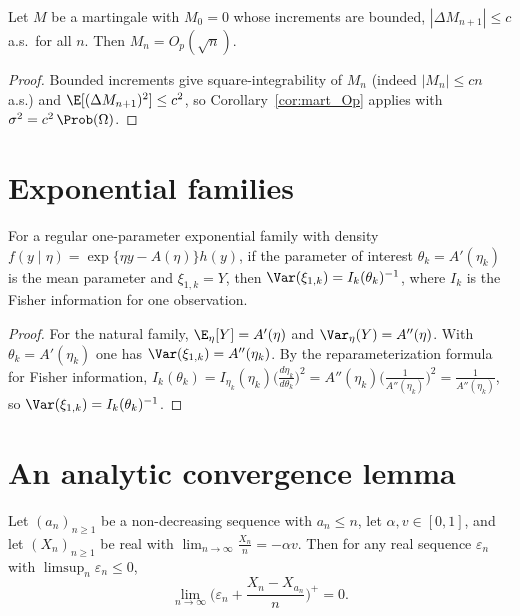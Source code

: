 \begin{lemma}\label{lem:mart_bdd_incr_Op}
\leanok
{}
Let $M$ be a martingale with $M_0 = 0$ whose increments are bounded,
$|\Delta M_{n+1}| \le c$ a.s.\ for all $n$. Then $M_n = O_p(\sqrt n)$.
\end{lemma}

\begin{proof}\leanok
{}
Bounded increments give square-integrability of $M_n$ (indeed $|M_n| \le cn$ a.s.)
and $\E[(\Delta M_{n+1})^2] \le c^2$, so Corollary~\ref{cor:mart_Op} applies with
$\sigma^2 = c^2\,\Prob(\Omega)$.
\end{proof}

\section{Exponential families}
\label{sec:tech_expfam}

\begin{proposition}\label{prop:exp_fam}
For a regular one-parameter exponential family with density
$f(y\mid\eta) = \exp\{\eta y - A(\eta)\}h(y)$, if the parameter of interest
$\theta_k = A'(\eta_k)$ is the mean parameter and $\xi_{1,k} = Y$, then
$\Var(\xi_{1,k}) = I_k(\theta_k)^{-1}$, where $I_k$ is the Fisher information for
one observation.
\end{proposition}

\begin{proof}
For the natural family, $\E_\eta[Y] = A'(\eta)$ and $\Var_\eta(Y) = A''(\eta)$.
With $\theta_k = A'(\eta_k)$ one has $\Var(\xi_{1,k}) = A''(\eta_k)$. By the
reparameterization formula for Fisher information,
$I_k(\theta_k) = I_{\eta_k}(\eta_k)\big(\frac{d\eta_k}{d\theta_k}\big)^2
 = A''(\eta_k)\big(\frac{1}{A''(\eta_k)}\big)^2 = \frac{1}{A''(\eta_k)}$,
so $\Var(\xi_{1,k}) = I_k(\theta_k)^{-1}$.
\end{proof}

\section{An analytic convergence lemma}
\label{sec:tech_analytic}

\begin{lemma}\label{lem:convergence}
\leanok
Let $(a_n)_{n\ge1}$ be a non-decreasing sequence with $a_n \le n$, let
$\alpha, v \in [0,1]$, and let $(X_n)_{n\ge1}$ be real with
$\lim_{n\to\infty} \frac{X_n}{n} = -\alpha v$. Then for any real sequence
$\varepsilon_n$ with $\limsup_n \varepsilon_n \le 0$,
\[
  \lim_{n\to\infty}\Big(\varepsilon_n + \frac{X_n - X_{a_n}}{n}\Big)^+ = 0.
\]
\end{lemma}

